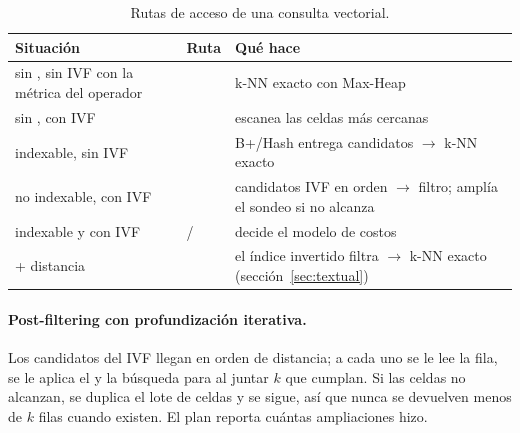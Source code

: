 \begin{table}[H]
\centering\small
\begin{tabularx}{\textwidth}{lYY}
\toprule
Situación & Ruta & Qué hace \\
\midrule
sin , sin IVF con la métrica del operador &  & k-NN exacto con Max-Heap \\
sin , con IVF &  & escanea las  celdas más cercanas \\
 indexable, sin IVF &  & B+/Hash entrega candidatos $\to$ k-NN exacto \\
 no indexable, con IVF &  & candidatos IVF en orden $\to$ filtro; amplía el sondeo si no alcanza \\
 indexable y con IVF &  /  & decide el modelo de costos \\
 + distancia &  & el índice invertido filtra $\to$ k-NN exacto (sección~\ref{sec:textual}) \\
\bottomrule
\end{tabularx}
\caption{Rutas de acceso de una consulta vectorial.}
\end{table}

\paragraph{Post-filtering con profundización iterativa.} Los candidatos del IVF llegan en
orden de distancia; a cada uno se le lee la fila, se le aplica el  y la búsqueda
para al juntar $k$ que cumplan. Si las  celdas no alcanzan, se duplica el lote
de celdas y se sigue, así que nunca se devuelven menos de $k$ filas cuando existen. El plan
reporta cuántas ampliaciones hizo.

